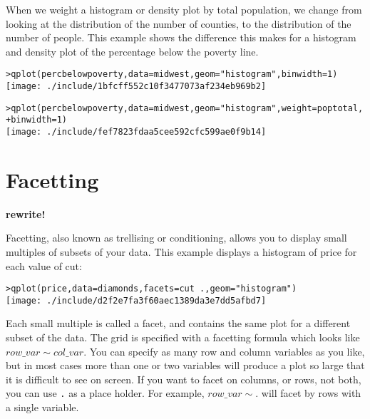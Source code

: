 When we weight a histogram or density plot by total population, we change from looking at the distribution of the number of counties, to the distribution of the number of people.  This example shows the difference this makes for a histogram and density plot of the percentage below the poverty line.

\begin{alltt}
> qplot(percbelowpoverty, data = midwest, geom = "histogram", binwidth = 1)
\texttt{[image: ./include/1bfcff552c10f3477073af234eb969b2]}

> qplot(percbelowpoverty, data = midwest, geom = "histogram", weight = poptotal, 
+     binwidth = 1)
\texttt{[image: ./include/fef7823fdaa5cee592cfc599ae0f9b14]}

\end{alltt}

\section{Facetting}\label{sec:facetting}

{\bf rewrite!}

Facetting, also known as trellising or conditioning, allows you to display small multiples of subsets of your data.  This example displays a histogram of price for each value of cut:

\begin{alltt}
> qplot(price, data = diamonds, facets = cut ~ ., geom = "histogram")
\texttt{[image: ./include/d2f2e7fa3f60aec1389da3e7dd5afbd7]}

\end{alltt}

Each small multiple is called a facet, and contains the same plot for a different subset of the data.  The grid is specified with a facetting formula which looks like $row\_var \sim col\_var $.  You can specify as many row and column variables as you like, but in most cases more than one or two variables will produce a plot so large that it is difficult to see on screen.  If you want to facet on columns, or rows, not both, you can use {\tt .} as a place holder.  For example, $row\_var \sim .$ will facet by rows with a single variable.  

